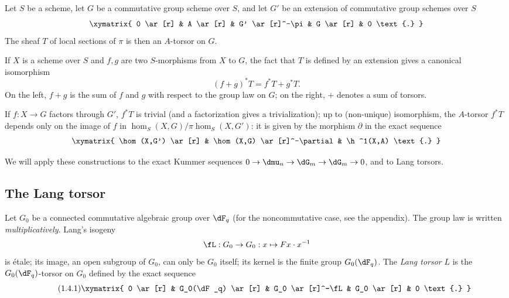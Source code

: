 \documentclass[oneside]{book}
\begin{document}
\subsection{}\label{VI:1-3}

Let $S$ be a scheme, let $G$ be a commutative group scheme over $S$, and let $G'$ 
be an extension of commutative group schemes over $S$
\[\xymatrix{
  0 \ar[r] 
    & A \ar[r] 
    & G' \ar[r]^-\pi 
    & G \ar[r] 
    & 0 \text{.}
}\]
The sheaf $T$ of local sections of $\pi$ is then an $A$-torsor on 
$G$. 

If $X$ is a scheme over $S$ and $f,g$ are two $S$-morphisms from $X$ to $G$, 
the fact that $T$ is defined by an extension gives a canonical isomorphism 
\begin{equation*}\tag{1.3.1}\label{VI:eq:1-3-1}
  (f+g)^\ast T = f^\ast T + g^\ast T \text{.}
\end{equation*}
On the left, $f+g$ is the sum of $f$ and $g$ with respect to the group law on $G$; 
on the right, $+$ denotes a sum of torsors. 

If $f:X\to G$ factors through $G'$, $f^\ast T$ is trivial (and a 
factorization gives a trivialization); up to (non-unique) isomorphism, 
the $A$-torsor $f^\ast T$ depends only on the image of $f$ in 
$\hom_S(X,G)/\pi\hom_S(X,G')$: it is given by the morphism $\partial$ in 
the exact sequence 
\[\xymatrix{
  \hom(X,G') \ar[r] 
    & \hom(X,G) \ar[r]^-\partial 
    & \h^1(X,A) \text{.}
}\]

We will apply these constructions to the exact Kummer sequences 
$0 \to \dmu_n \to \dG_m \to \dG_m \to 0$, and to Lang torsors. 





\subsection{The Lang torsor}\label{VI:1-4}

Let $G_0$ be a connected commutative algebraic group over $\dF_q$ (for the 
noncommutative case, see the appendix). The group law is written 
\emph{multiplicatively}. Lang's isogeny 
\[
\fL:G_0 \to G_0: x\mapsto F x\cdot x^{-1}
\]
is étale; its image, an open subgroup of $G_0$, can only be 
$G_0$ itself; its kernel is the finite group $G_0(\dF_q)$. The \emph{Lang 
torsor} $L$ is the $G_0(\dF_q)$-torsor on $G_0$ defined by the exact sequence 
\begin{equation*}\tag{1.4.1}\label{VI:eq:1-4-1}
\xymatrix{
  0 \ar[r] 
    & G_0(\dF_q) \ar[r] 
    & G_0 \ar[r]^-\fL 
    & G_0 \ar[r] 
    & 0 \text{.}
}
\end{equation*}
\end{document}
